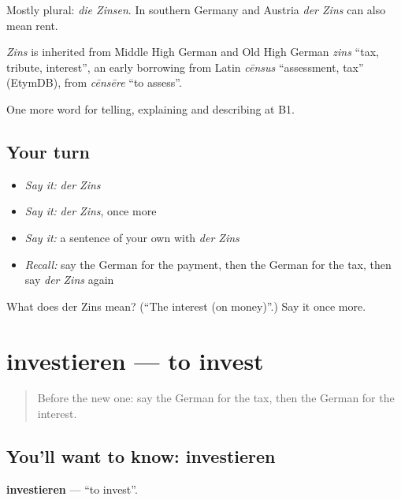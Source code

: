 Mostly plural: \emph{die Zinsen}. In southern Germany and Austria \emph{der Zins} can also mean rent.

\begin{cousinweb}
\emph{Zins} is inherited from Middle High German and Old High German \emph{zins} \textquotedblleft{}tax, tribute, interest\textquotedblright{}, an early borrowing from Latin \emph{cēnsus} \textquotedblleft{}assessment, tax\textquotedblright{} (EtymDB), from \emph{cēnsēre} \textquotedblleft{}to assess\textquotedblright{}.
\end{cousinweb}

\begin{grammarlens}[title={What you've built}]
One more word for telling, explaining and describing at B1.
\end{grammarlens}

\subsection*{Your turn}
\begin{itemize}
\raggedright
  \item \emph{Say it:} \emph{der Zins}
  \item \emph{Say it:} \emph{der Zins}, once more
  \item \emph{Say it:} a sentence of your own with \emph{der Zins}
  \item \emph{Recall:} say the German for the payment, then the German for the tax, then say \emph{der Zins} again
\end{itemize}

\begin{tcolorbox}[breakable,colback=teal!4,colframe=teal!35!black,title={Before you move on}]
What does der Zins mean? (\textquotedblleft{}The interest (on money)\textquotedblright{}.) Say it once more.
\end{tcolorbox}
\section[investieren]{investieren — to invest}

\label{lesson:GE-C391-investieren}



\begin{quote}
Before the new one: say the German for the tax, then the German for the interest.
\end{quote}

\subsection*{You'll want to know: investieren}
\textbf{investieren} — \textquotedblleft{}to invest\textquotedblright{}.

